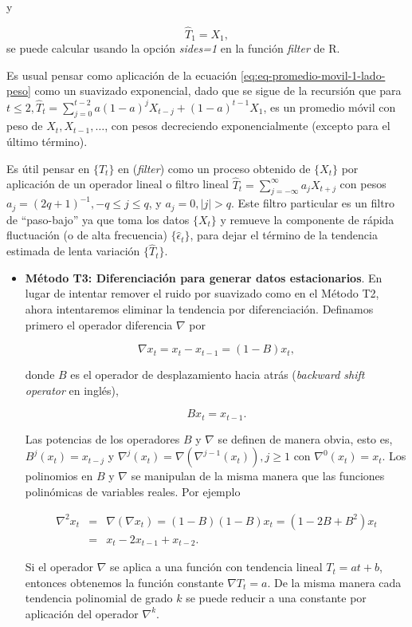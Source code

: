 \documentclass[12pt,]{krantz}
\providecommand{\tightlist}{%
  \setlength{\itemsep}{0pt}\setlength{\parskip}{0pt}}
\theoremstyle{definition}
\theoremstyle{definition}
\theoremstyle{definition}
\theoremstyle{remark}
\begin{document}
y

\[\hat{T}_1=X_1,\] se puede calcular usando la opción \emph{sides=1} en
la función \emph{filter} de R.

Es usual pensar como aplicación de la ecuación
\eqref{eq:eq-promedio-movil-1-lado-peso} como un suavizado exponencial,
dado que se sigue de la recursión que para
\(t\leq2, \hat{T}_t=\sum_{j=0}^{t-2}a(1-a)^jX_{t-j}+(1-a)^{t-1}X_1\), es
un promedio móvil con peso de \(X_t,X_{t-1},\ldots\), con pesos
decreciendo exponencialmente (excepto para el último término).

Es útil pensar en \(\{\hat{T}_t\}\) en (\emph{filter}) como un proceso
obtenido de \(\{X_t\}\) por aplicación de un operador lineal o filtro
lineal \(\hat{T}_t=\sum_{j=-\infty}^{\infty}a_jX_{t+j}\) con pesos
\(a_j=(2q+1)^{-1},-q\leq j\leq q\), y \(a_j=0,|j|>q\). Este filtro
particular es un filtro de ``paso-bajo'' ya que toma los datos
\(\{X_t\}\) y remueve la componente de rápida fluctuación (o de alta
frecuencia) \(\{\hat{\epsilon}_t\}\), para dejar el término de la
tendencia estimada de lenta variación \(\{\hat{T}_t\}\).

\begin{itemize}
\tightlist
\item
  \textbf{Método T3: Diferenciación para generar datos estacionarios}.
  En lugar de intentar remover el ruido por suavizado como en el Método
  T2, ahora intentaremos eliminar la tendencia por diferenciación.
  Definamos primero el operador diferencia \(\nabla\) por

  \begin{equation}
    \nabla x_t = x_t-x_{t-1}=(1-B)x_t,
  \label{eq:eq-operador-diferencia}
  \end{equation}

  donde \(B\) es el operador de desplazamiento hacia atrás
  (\emph{backward shift operator} en inglés),

  \begin{equation}
    Bx_t=x_{t-1}.
  \label{eq:eq-backward-shift-operator}
  \end{equation}

  Las potencias de los operadores \(B\) y \(\nabla\) se definen de
  manera obvia, esto es, \(B^j(x_t)=x_{t-j}\) y
  \(\nabla^j(x_t)=\nabla(\nabla^{j-1}(x_t)),j\geq1\) con
  \(\nabla^0(x_t)=x_t\). Los polinomios en \(B\) y \(\nabla\) se
  manipulan de la misma manera que las funciones polinómicas de
  variables reales. Por ejemplo

  \begin{eqnarray*}
    \nabla^2x_t &=& \nabla(\nabla x_t) = (1-B)(1-B)x_t = (1-2B+B^2)x_t \\
            &=& x_t-2x_{t-1}+x_{t-2}.
  \end{eqnarray*}

  Si el operador \(\nabla\) se aplica a una función con tendencia lineal
  \(T_t=at+b\), entonces obtenemos la función constante
  \(\nabla T_t=a\). De la misma manera cada tendencia polinomial de
  grado \(k\) se puede reducir a una constante por aplicación del
  operador \(\nabla^k\).
\end{itemize}
\end{document}

